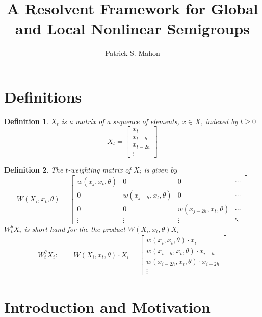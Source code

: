 \documentclass{article}
\newtheorem{definition}{Definition}
\begin{document}
\title{A Resolvent Framework for Global and Local Nonlinear Semigroups}
\author{Patrick S. Mahon}
\maketitle

\tableofcontents
\printunsrtglossary[type=symbols,style=long]

\section{Definitions}
\begin{definition}
$X_t$ is a matrix of a sequence of elements, $x \in X$, indexed by $t\geq0$
$$ X_t = 
\begin{bmatrix}
    x_t \\ 
    x_{t-h} \\ 
    x_{t-2h} \\
    \vdots
\end{bmatrix}
$$
\end{definition}

\begin{definition}
The $t$-weighting matrix of $X_i$ is given by $$W(X_i, x_t, \theta) =
\begin{bmatrix}
    w(x_j, x_t, \theta) & 0 & 0 &\cdots \\
    0 & w(x_{j-h}, x_t, \theta) & 0 &  \cdots\\
    0 & 0 & w(x_{j-2h}, x_t, \theta) & \cdots\\
    \vdots & \vdots & \vdots & \ddots
\end{bmatrix}$$\medskip
$W_t^\theta X_{i}$ is short hand for the the product $W(X_i, x_t, \theta) X_i$ 
\begin{align*}
    W_t^\theta X_{i} :&= W(X_i, x_t, \theta) \cdot X_i = 
    \begin{bmatrix}
        w(x_i, x_t, \theta) \cdot x_i \\
        w(x_{i-h}, x_t, \theta) \cdot x_{i-h} \\
        w(x_{i-2h}, x_t, \theta) \cdot x_{i-2h} \\
        \vdots
\end{bmatrix}
\end{align*}
\end{definition}

\section{Introduction and Motivation}
\end{document}
